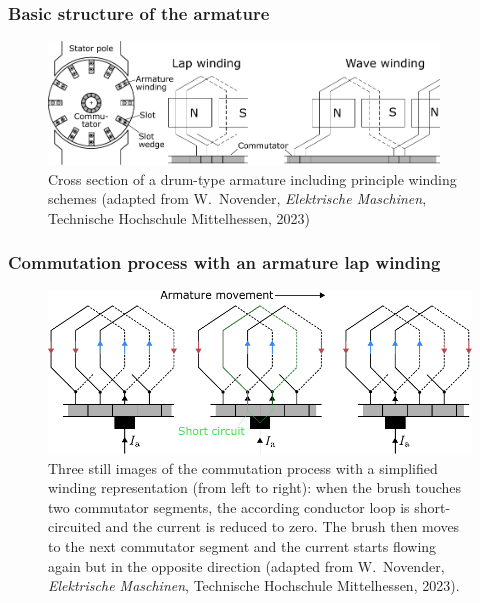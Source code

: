 \begin{frame}
	\frametitle{Basic structure of the armature}
    \begin{figure}
        \centering
        \includegraphics[width=0.925\textwidth]{fig/lec03/Armature_slots.pdf}
        \caption{Cross section of a drum-type armature including principle winding schemes (adapted from W.~Novender, \textit{Elektrische Maschinen}, Technische Hochschule Mittelhessen, 2023)}
    \end{figure}
\end{frame}

\begin{frame}
	\frametitle{Commutation process with an armature lap winding}
	\vspace{-0.1cm}
    \begin{figure}
        \centering
        \includegraphics[height=0.6\textheight]{fig/lec03/Commutation_process_lap_winding.pdf}
        \caption{Three still images of the commutation process with a simplified winding representation (from left to right): when the brush touches two commutator segments, the according conductor loop is short-circuited and the current is reduced to zero. The brush then moves to the next commutator segment and the current starts flowing again but in the opposite direction (adapted from W.~Novender, \textit{Elektrische Maschinen}, Technische Hochschule Mittelhessen, 2023).}
    \end{figure}
\end{frame}

